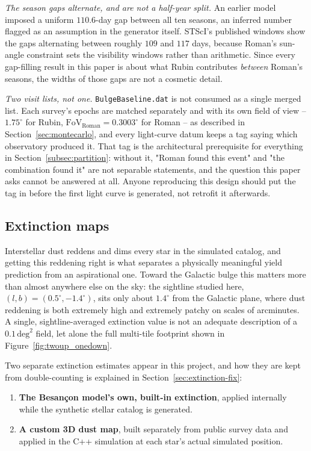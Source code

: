 \documentclass[english,10pt,a4paper]{article}
\begin{document}
	\emph{The season gaps alternate, and are not a half-year split.} An earlier model imposed a uniform $110.6$-day gap between all ten seasons, an inferred number flagged as an assumption in the generator itself. STScI's published windows show the gaps alternating between roughly $109$ and $117$ days, because Roman's sun-angle constraint sets the visibility windows rather than arithmetic. Since every gap-filling result in this paper is about what Rubin contributes \emph{between} Roman's seasons, the widths of those gaps are not a cosmetic detail.

	\emph{Two visit lists, not one.} \texttt{BulgeBaseline.dat} is not consumed as a single merged list. Each survey's epochs are matched separately and with its own field of view -- $1.75^{\circ}$ for Rubin, $\mathrm{FoV}_{\mathrm{Roman}}=0.3003^{\circ}$ for Roman -- as described in Section~\ref{sec:montecarlo}, and every light-curve datum keeps a tag saying which observatory produced it. That tag is the architectural prerequisite for everything in Section~\ref{subsec:partition}: without it, "Roman found this event" and "the combination found it" are not separable statements, and the question this paper asks cannot be answered at all. Anyone reproducing this design should put the tag in before the first light curve is generated, not retrofit it afterwards.
	
	\subsection{Extinction maps}
	\label{sec:extinction}
	
	Interstellar dust reddens and dims every star in the simulated catalog, and getting this reddening right is what separates a physically meaningful yield prediction from an aspirational one. Toward the Galactic bulge this matters more than almost anywhere else on the sky: the sightline studied here, $(l,b)=(0.5^{\circ},-1.4^{\circ})$, sits only about $1.4^{\circ}$ from the Galactic plane, where dust reddening is both extremely high and extremely patchy on scales of arcminutes. A single, sightline-averaged extinction value is not an adequate description of a $0.1\,\mathrm{deg}^2$ field, let alone the full multi-tile footprint shown in Figure~\ref{fig:twoup_onedown}.
	
	Two separate extinction estimates appear in this project, and how they are kept from double-counting is explained in Section~\ref{sec:extinction-fix}:
	
	\begin{enumerate}
		\item \textbf{The Besan\c{c}on model's own, built-in extinction}, applied internally while the synthetic stellar catalog is generated.
		\item \textbf{A custom 3D dust map}, built separately from public survey data and applied in the C++ simulation at each star's actual simulated position.
	\end{enumerate}
	
\end{document}
